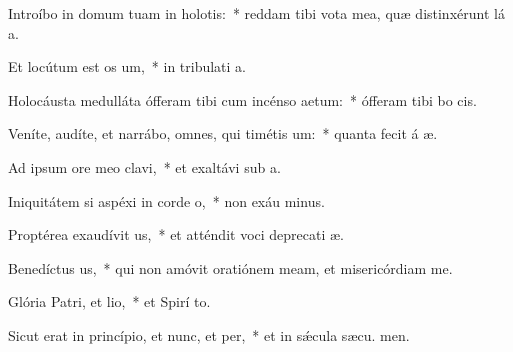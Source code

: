 \item Introíbo in domum tuam in holotis:~* reddam tibi vota mea, quæ distinxérunt lá a.
\item Et locútum est os um,~* in tribulati a.
\item Holocáusta medulláta ófferam tibi cum incénso aetum:~* ófferam tibi bo  cis.
\item Veníte, audíte, et narrábo, omnes, qui timétis um:~* quanta fecit á æ.
\item Ad ipsum ore meo clavi,~* et exaltávi sub  a.
\item Iniquitátem si aspéxi in corde o,~* non exáu minus.
\item Proptérea exaudívit us,~* et atténdit voci deprecati æ.
\item Benedíctus us,~* qui non amóvit oratiónem meam, et misericórdiam   me.
\item Glória Patri, et lio,~* et Spirí to.
\item Sicut erat in princípio, et nunc, et per,~* et in sǽcula sæcu. men.
